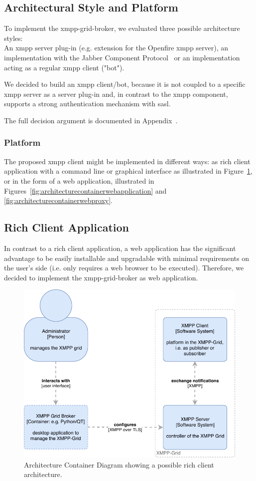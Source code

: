 \subsection{Architectural Style and Platform}

To implement the \gls{xmpp-grid-broker}, we evaluated three possible architecture styles:\hfill\\
An \gls{xmpp} server plug-in (e.g. extension for the Openfire \gls{xmpp} server), an implementation with the Jabber Component Protocol~\cite{xep-0114} or an implementation acting as a regular \gls{xmpp} client ("bot").

We decided to build an \gls{xmpp} client/bot, because it is not coupled to a specific \gls{xmpp} server as a server plug-in and, in contrast to the \gls{xmpp} component, supports a strong authentication mechanism with \gls{sasl}.

The full decision argument is documented in Appendix~.

\subsubsection{Platform}

The proposed \gls{xmpp} client might be implemented in different ways: as rich client application with a command line or graphical interface as illustrated in Figure~\ref{fig:architecturecontainerrichclient}, or in the form of a web application, illustrated in Figures~\ref{fig:architecturecontainerwebapplication} and \ref{fig:architecturecontainerwebproxy}.

\subsection{Rich Client Application}

In contrast to a rich client application, a web application has the significant advantage to be easily installable and upgradable with minimal requirements on the user's side (i.e. only requires a web browser to be executed).
Therefore, we decided to implement the \gls{xmpp-grid-broker} as web application.

\begin{figure}[h]
\centering
\includegraphics[width=0.7\linewidth]{resources/architecture_container_rich_client}
\caption[Architecture Container Diagram: Rich Client]{Architecture Container Diagram showing a possible rich client architecture.}
\label{fig:architecturecontainerrichclient}
\end{figure}


